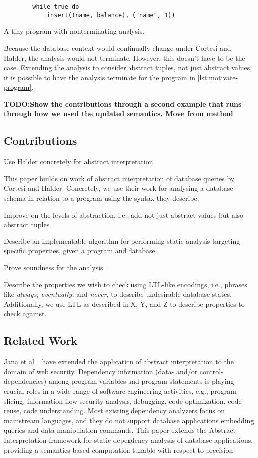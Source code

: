 \begin{listing}
    \begin{verbatim}
        while true do
            insert((name, balance), ("name", 1))
    \end{verbatim}
    \caption{A tiny program with nonterminating analysis.}
    \label{lst:motivate-program}
\end{listing}


Because the database context would continually change under Cortesi and Halder, the analysis would not terminate.
However, this doesn't have to be the case.
Extending the analysis to consider abstract tuples, not just abstract values, it is possible to have the analysis terminate for the program in \autoref{lst:motivate-program}.

\textbf{TODO:Show the contributions through a second example that runs through how we used the updated semantics. Move from method}

\subsection{Contributions}\label{subsec:contributions}

Use Halder concretely for abstract interpretation

This paper builds on work of abstract interpretation of database queries by Cortesi and Halder.
Concretely, we use their work for analysing a database schema in relation to a program using the syntax they describe.


Improve on the levels of abstraction, i.e., add not just abstract values but also abstract tuples

Describe an implementable algorithm for performing static analysis targeting specific properties, given a program and database.

Prove soundness for the analysis.

Describe the properties we wish to check using LTL-like encodings, i.e., phrases like \emph{always, eventually,} and \emph{never}, to describe undesirable database states.
Additionally, we use LTL as described in X, Y, and Z to describe properties to check against.


\subsection{Related Work}\label{subsec:related-work}
Jana et al.~\cite{jana_extending_2020} have extended the application of abstract interpretation to the domain of web security.
Dependency information (data- and/or control-dependencies) among program variables and program statements is playing crucial roles in a wide range of software-engineering activities, e.g., program slicing, information flow security analysis, debugging, code optimization, code reuse, code understanding.
Most existing dependency analyzers focus on mainstream languages, and they do not support database applications embedding queries and data-manipulation commands.
This paper extends the Abstract Interpretation framework for static dependency analysis of database applications, providing a semantics-based computation tunable with respect to precision.

